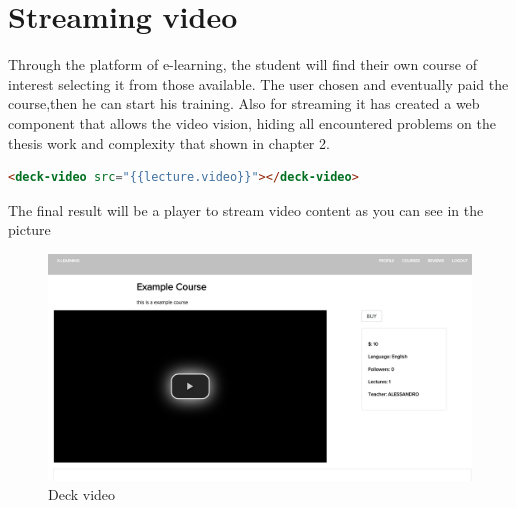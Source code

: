 \section{Streaming video}
\label{sec:attend_the_course}

Through the platform of e-learning, the student will find their own course of interest selecting it from those available.
The user chosen and eventually paid the course,then he can start his training.
Also for streaming it has created a web component that allows the video vision, hiding all encountered problems on the thesis work and complexity that shown in chapter 2.

\begin{lstlisting}[language=html]
       <deck-video src="{{lecture.video}}"></deck-video>
\end{lstlisting}

The final result will be a player to stream video content as you can see in the picture

\begin{figure}[htb]
 \centering
 \includegraphics[width=1.0\linewidth]{images/chapter6/deck_video.png}\hfill
 \caption[Deck video]{Deck video}
 \label{fig:fourV}
\end{figure}

